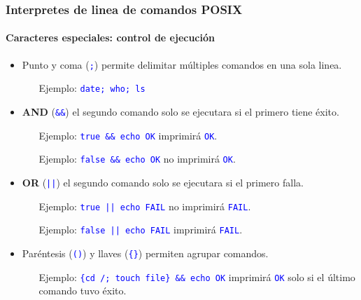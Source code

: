 \documentclass[11pt,a4paper,spanish]{beamer}
\newcommand{\cw}[1]{\mbox{\texttt{\textcolor{blue}{#1}}}}
\begin{document}
\begin{frame}

    \frametitle{Interpretes de linea de comandos POSIX}
    \framesubtitle{Caracteres especiales: control de ejecución}

    \begin{itemize}
        \item Punto y coma (\cw{;}) permite delimitar múltiples comandos
            en una sola linea.
        \begin{itemize}
            \item[Ejemplo:] \cw{date; who; ls}\pause
        \end{itemize}
    \item \textbf{AND} (\cw{\&\&}) el segundo comando solo se ejecutara
        si el primero tiene éxito.
        \begin{itemize}
            \item[Ejemplo:] \cw{true \&\& echo OK} imprimirá \cw{OK}.
            \item[Ejemplo:] \cw{false \&\& echo OK} no imprimirá \cw{OK}.
            \pause
        \end{itemize}
    \item \textbf{OR} (\cw{||}) el segundo comando solo se ejecutara si
        el primero falla.
        \begin{itemize}
            \item[Ejemplo:] \cw{true || echo FAIL} no imprimirá \cw{FAIL}.
            \item[Ejemplo:] \cw{false || echo FAIL} imprimirá \cw{FAIL}.
            \pause
        \end{itemize}
    \item Paréntesis  (\cw{()}) y llaves (\cw{\{\}}) permiten
        agrupar comandos.
        \begin{itemize}
            \item[Ejemplo:] \cw{\{cd /; touch file\} \&\& echo OK}
                imprimirá \cw{OK} solo si el último comando tuvo éxito.
        \end{itemize}
    \end{itemize}

\end{frame}
\end{document}
